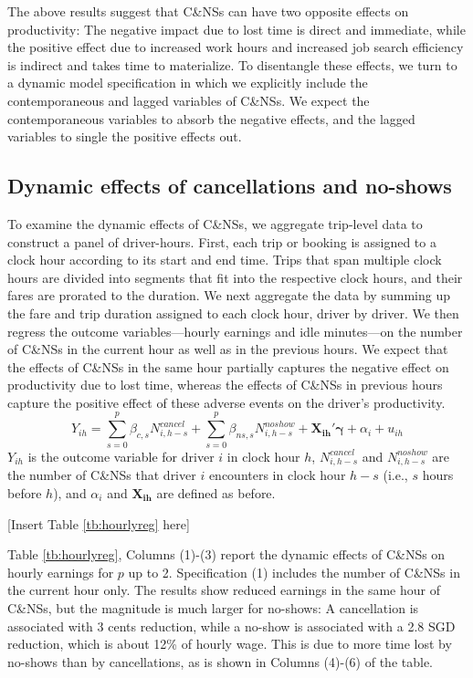 \documentclass[reviewmode]{restud}
\begin{document}
The above results suggest that C\&NSs can have two opposite effects on productivity: The negative impact due to lost time is direct and immediate, while the positive effect due to increased work hours and increased job search efficiency is indirect and takes time to materialize. To disentangle these effects, we turn to a dynamic model specification in which we explicitly include the contemporaneous and lagged variables of C\&NSs. We expect the contemporaneous variables to absorb the negative effects, and the lagged variables to single the positive effects out.



\subsection{Dynamic effects of cancellations and no-shows}
To examine the dynamic effects of C\&NSs, we aggregate trip-level data to construct a panel of driver-hours. First, each trip or booking is assigned to a clock hour according to its start and end time. Trips that span multiple clock hours are divided into segments that fit into the respective clock hours, and their fares are prorated to the duration. We next aggregate the data by summing up the fare and trip duration assigned to each clock hour, driver by driver. We then regress the outcome variables---hourly earnings and idle minutes---on the number of C\&NSs in the current hour as well as in the previous hours. We expect that the effects of C\&NSs in the same hour partially captures the negative effect on productivity due to lost time, whereas the effects of C\&NSs in previous hours capture the positive effect of these adverse events on the driver's productivity.
\begin{equation}
Y_{ih} = \sum_{s=0}^p \beta_{c,s} N^{cancel}_{i,h-s} + \sum_{s=0}^p \beta_{ns,s} N^{noshow}_{i,h-s} +  \mathbf{X_{ih}}'\mathbf{\gamma} + \alpha_i + u_{ih}
\end{equation}
$Y_{ih}$ is the outcome variable for driver $i$ in clock hour $h$, $N^{cancel}_{i, h-s}$ and $N^{noshow}_{i, h-s}$ are the number of C\&NSs that driver $i$ encounters in clock hour $h-s$ (i.e., $s$ hours before $h$), and $\alpha_i$ and $\mathbf{X_{ih}}$ are defined as before.

\begin{center}
	[Insert Table \ref{tb:hourlyreg} here]
\end{center}

Table \ref{tb:hourlyreg}, Columns (1)-(3) report the dynamic effects of C\&NSs on hourly earnings for $p$ up to 2. Specification (1) includes the number of C\&NSs in the current hour only. The results show reduced earnings in the same hour of C\&NSs, but the magnitude is much larger for no-shows: A cancellation is associated with 3 cents reduction, while a no-show is associated with a 2.8 SGD reduction, which is about 12\% of hourly wage. This is due to more time lost by no-shows than by cancellations, as is shown in Columns (4)-(6) of the table. 
\end{document}

